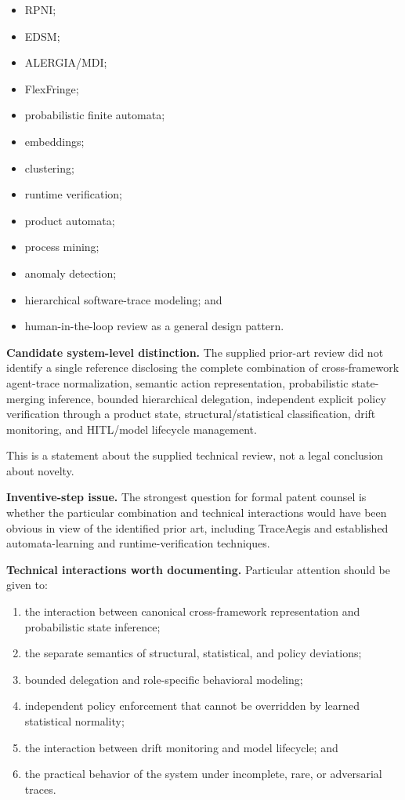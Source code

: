 \documentclass[11pt,a4paper]{article}
\begin{document}
\begin{itemize}
\item RPNI;
\item EDSM;
\item ALERGIA/MDI;
\item FlexFringe;
\item probabilistic finite automata;
\item embeddings;
\item clustering;
\item runtime verification;
\item product automata;
\item process mining;
\item anomaly detection;
\item hierarchical software-trace modeling; and
\item human-in-the-loop review as a general design pattern.
\end{itemize}

\textbf{Candidate system-level distinction.}
The supplied prior-art review did not identify a single reference disclosing the complete
combination of cross-framework agent-trace normalization, semantic action
representation, probabilistic state-merging inference, bounded hierarchical delegation,
independent explicit policy verification through a product state, structural/statistical
classification, drift monitoring, and HITL/model lifecycle management.

This is a statement about the supplied technical review, not a legal conclusion about
novelty.

\textbf{Inventive-step issue.}
The strongest question for formal patent counsel is whether the particular combination
and technical interactions would have been obvious in view of the identified prior art,
including TraceAegis and established automata-learning and runtime-verification
techniques.

\textbf{Technical interactions worth documenting.}
Particular attention should be given to:

\begin{enumerate}
\item the interaction between canonical cross-framework representation and probabilistic
state inference;
\item the separate semantics of structural, statistical, and policy deviations;
\item bounded delegation and role-specific behavioral modeling;
\item independent policy enforcement that cannot be overridden by learned statistical
normality;
\item the interaction between drift monitoring and model lifecycle; and
\item the practical behavior of the system under incomplete, rare, or adversarial traces.
\end{enumerate}
\end{document}
